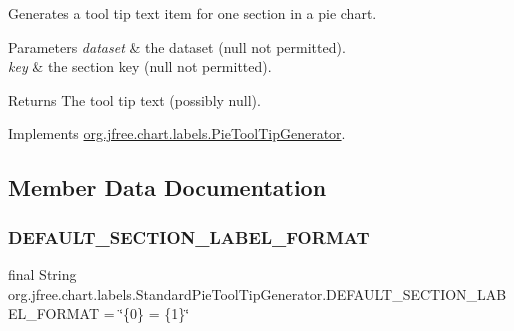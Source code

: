 Generates a tool tip text item for one section in a pie chart.


\begin{DoxyParams}{Parameters}
{\em dataset} & the dataset ({\ttfamily null} not permitted). \\
\hline
{\em key} & the section key ({\ttfamily null} not permitted).\\
\hline
\end{DoxyParams}
\begin{DoxyReturn}{Returns}
The tool tip text (possibly {\ttfamily null}). 
\end{DoxyReturn}


Implements \mbox{\hyperlink{interfaceorg_1_1jfree_1_1chart_1_1labels_1_1_pie_tool_tip_generator_ae31d3fc9243c9c0d94f8094aaa765493}{org.\+jfree.\+chart.\+labels.\+Pie\+Tool\+Tip\+Generator}}.



\subsection{Member Data Documentation}
\mbox{\label{classorg_1_1jfree_1_1chart_1_1labels_1_1_standard_pie_tool_tip_generator_a5dc585e904200ee2586253a2bb6bb390}} 
\subsubsection{\texorpdfstring{D\+E\+F\+A\+U\+L\+T\+\_\+\+S\+E\+C\+T\+I\+O\+N\+\_\+\+L\+A\+B\+E\+L\+\_\+\+F\+O\+R\+M\+AT}{DEFAULT\_SECTION\_LABEL\_FORMAT}}
{\footnotesize\ttfamily final String org.\+jfree.\+chart.\+labels.\+Standard\+Pie\+Tool\+Tip\+Generator.\+D\+E\+F\+A\+U\+L\+T\+\_\+\+S\+E\+C\+T\+I\+O\+N\+\_\+\+L\+A\+B\+E\+L\+\_\+\+F\+O\+R\+M\+AT = \char`\"{}\{0\} = \{1\}\char`\"{}\hspace{0.3cm}{\ttfamily [static]}}

